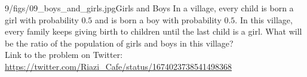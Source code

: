 \begin{problem}{9/figs/09_boys_and_girls.jpg}{Girls and Boys} In a village, every child is born a girl with probability $0.5$ and is born a boy with probability $0.5$. In this village, every family keeps giving birth to children until the last child is a girl. What will be the ratio of the population of girls and boys in this village?\\[0.2cm]

Link to the problem on Twitter:  \url{https://twitter.com/Riazi_Cafe/status/1674023738541498368}\end{problem}